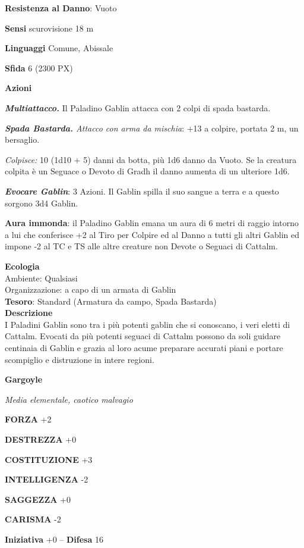 \begin{multicols}{2}
	\textbf{Resistenza al Danno}: Vuoto

	\textbf{Sensi} scurovisione 18 m

	\textbf{Linguaggi} Comune, Abissale

	\textbf{Sfida} 6 (2300 PX)

	\textbf{Azioni}

	\textit{\textbf{Multiattacco.}} Il Paladino Gablin attacca con 2 colpi di spada bastarda.

	\textit{\textbf{Spada Bastarda.} Attacco con arma da mischia}: +13 a colpire, portata 2 m, un bersaglio.

	\textit{Colpisce:} 10 (1d10 + 5) danni da botta, più 1d6 danno da Vuoto. Se la creatura colpita è un Seguace o Devoto di Gradh il danno aumenta di un ulteriore 1d6.

	\textit{\textbf{Evocare Gablin}}: 3 Azioni. Il Gablin spilla il suo sangue a terra e a questo sorgono 3d4 Gablin.

	\textbf{Aura immonda}: il Paladino Gablin emana un aura di 6 metri di raggio intorno a lui che conferisce +2 al Tiro per Colpire ed al Danno a tutti gli altri Gablin ed impone -2 al TC e TS alle altre creature non Devote o Seguaci di Cattalm.

	\textbf{Ecologia}\\
	Ambiente: Qualsiasi\\
	Organizzazione: a capo di un armata di Gablin\\
	\textbf{Tesoro}: Standard (Armatura da campo, Spada Bastarda)\\
	\textbf{Descrizione}\\
	I Paladini Gablin sono tra i più potenti gablin che si conoscano, i veri eletti di Cattalm. Evocati da più potenti seguaci di Cattalm possono da soli guidare centinaia di Gablin e grazia al loro acume preparare accurati piani e portare scompiglio e distruzione in intere regioni.

	\medskip{}\textbf{Gargoyle}

	\textit{Media elementale, caotico malvagio}

	\textbf{FORZA} +2

	\textbf{DESTREZZA} +0

	\textbf{COSTITUZIONE} +3

	\textbf{INTELLIGENZA} -2

	\textbf{SAGGEZZA} +0

	\textbf{CARISMA} -2

	\textbf{Iniziativa} +0 -- \textbf{Difesa} 16


\end{multicols}

